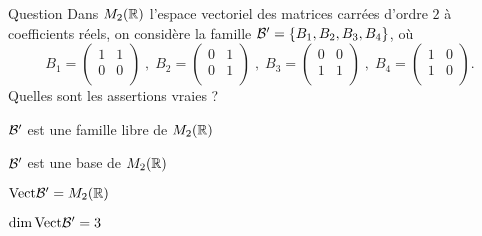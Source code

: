 \begin{multi}[multiple,feedback=
{On vérifie que \(B_1+B_3=B_2+B_4\) et que \(\{B_1,B_2,B_3\}\) est une famille libre. Donc 
\(\dim \mbox{Vect} {\cal {B'}}=3\).
}]{Question}
Dans \(M_2(\mathbb{R})\) l'espace vectoriel des matrices carrées d'ordre \(2\) à coefficients réels, on considère la famille \({\cal {B'}}= \{ B_1,B_2,B_3,B_4\}\), où 
\[ B_1 = \left(\begin{array}{rc}1&1\\
0&0\\ \end{array}\right) \; , \; B_2 = \left(\begin{array}{rc}
0&1\\0&1\\ 
\end{array}\right) \; , \; B_3 = \left(\begin{array}{rc}
0&0\\1&1\\ 
\end{array}\right) \; ,\; B_4 = \left(\begin{array}{rc}
1&0\\1&0\\ 
\end{array}\right).\]
Quelles sont les assertions vraies ?

    \item \({\cal {B'}}\) est une famille libre de \(M_2(\mathbb{R})\)
    \item \({\cal {B'}}\) est une base de \(M_2(\mathbb{R})\)
    \item \(\mbox{Vect} {\cal {B'}}=M_2(\mathbb{R})\)
    \item* \(\dim \mbox{Vect} {\cal {B'}}=3\)
\end{multi}


